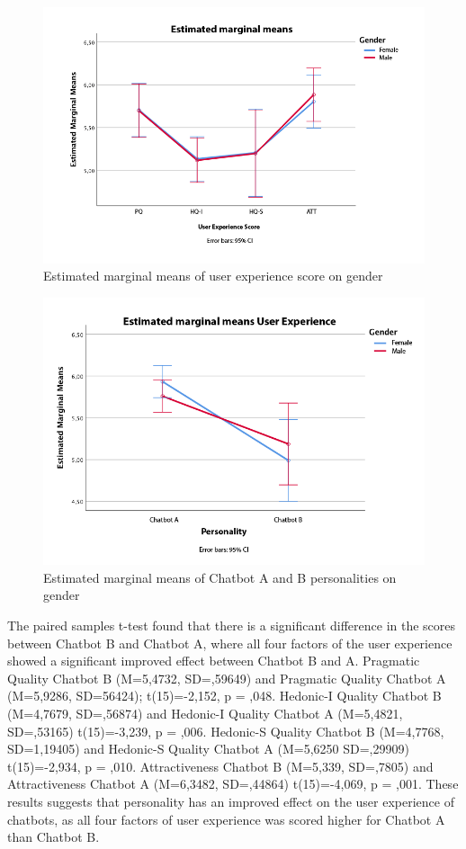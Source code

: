 \begin{figure}[h]
    \centering
    \includegraphics[scale=0.4]{figures/ux-gender.png}
    \caption{Estimated marginal means of user experience score on gender}
    \label{fig:uxgend}
\end{figure}

\begin{figure}[h]
    \centering
    \includegraphics[scale=0.4]{figures/pers-gender.png}
    \caption{Estimated marginal means of Chatbot A and B personalities on gender}
    \label{fig:persgender}
\end{figure}

The paired samples t-test found that there is a significant difference in the scores between Chatbot B and Chatbot A, where all four factors of the user experience showed a significant improved effect between Chatbot B and A. Pragmatic Quality Chatbot B (M=5,4732, SD=,59649) and Pragmatic Quality Chatbot A (M=5,9286, SD=56424); t(15)=-2,152, p = ,048. Hedonic-I Quality Chatbot B (M=4,7679, SD=,56874) and Hedonic-I Quality Chatbot A (M=5,4821, SD=,53165) t(15)=-3,239, p = ,006. Hedonic-S Quality Chatbot B (M=4,7768, SD=1,19405) and Hedonic-S Quality Chatbot A (M=5,6250 SD=,29909) t(15)=-2,934, p = ,010. Attractiveness Chatbot B (M=5,339, SD=,7805) and Attractiveness Chatbot A (M=6,3482, SD=,44864) t(15)=-4,069, p = ,001. These results suggests that personality has an improved effect on the user experience of chatbots, as all four factors of user experience was scored higher for Chatbot A than Chatbot B.

